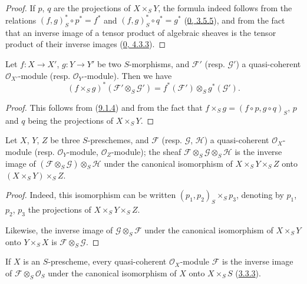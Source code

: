 \begin{proof}
If $p$, $q$ are the projections of $X\times_S Y$, the formula indeed
follows from the relations $(f,g)_S^*\circ p^*=f^*$ and
$(f,g)_S^*\circ q^*=g^*$ (\hyperref[0.3.5.5]{0, 3.5.5}), and from the
fact that an inverse image of a tensor product of algebraic sheaves is
the tensor product of their inverse images
(\hyperref[0.4.3.3]{0, 4.3.3}).
\end{proof}

\begin{corollary}[9.1.5]
\label{I.9.1.5}
Let $f:X\to X'$, $g:Y\to Y'$ be two $S$-morphisms, and $\mathscr{F}'$
(resp. $\mathscr{G}'$) a quasi-coherent $\mathscr{O}_{X'}$-module (resp.
$\mathscr{O}_{Y'}$-module). Then we have
\[
  (f\times_S g)^*(\mathscr{F}'\otimes_S\mathscr{G}')
  =f^*(\mathscr{F}')\otimes_S g^*(\mathscr{G}').
\]
\end{corollary}

\begin{proof}
This follows from (\hyperref[I.9.1.4]{9.1.4}) and from the fact that
$f\times_S g=(f\circ p,g\circ q)_S$, $p$ and $q$ being the projections of
$X\times_S Y$.
\end{proof}

\begin{corollary}[9.1.6]
\label{I.9.1.6}
Let $X$, $Y$, $Z$ be three $S$-preschemes, and $\mathscr{F}$ (resp.
$\mathscr{G}$, $\mathscr{H}$) a quasi-coherent $\mathscr{O}_X$-module
(resp. $\mathscr{O}_Y$-module, $\mathscr{O}_Z$-module); the sheaf
$\mathscr{F}\otimes_S\mathscr{G}\otimes_S\mathscr{H}$ is the inverse image
of $(\mathscr{F}\otimes_S\mathscr{G})\otimes_S\mathscr{H}$ under the
canonical isomorphism of $X\times_S Y\times_S Z$ onto
$(X\times_S Y)\times_S Z$.
\end{corollary}

\begin{proof}
Indeed, this isomorphism can be written $(p_1,p_2)_S\times_S p_3$,
denoting by $p_1$, $p_2$, $p_3$ the projections of $X\times_S Y\times_S Z$.

Likewise, the inverse image of $\mathscr{G}\otimes_S\mathscr{F}$ under the
canonical isomorphism of $X\times_S Y$ onto $Y\times_S X$ is
$\mathscr{F}\otimes_S\mathscr{G}$.
\end{proof}

\begin{corollary}[9.1.7]
\label{I.9.1.7}
If $X$ is an $S$-prescheme, every quasi-coherent $\mathscr{O}_X$-module
$\mathscr{F}$ is the inverse image of
$\mathscr{F}\otimes_S\mathscr{O}_S$ under the canonical isomorphism of $X$
onto $X\times_S S$ (\hyperref[I.3.3.3]{3.3.3}).
\end{corollary}

